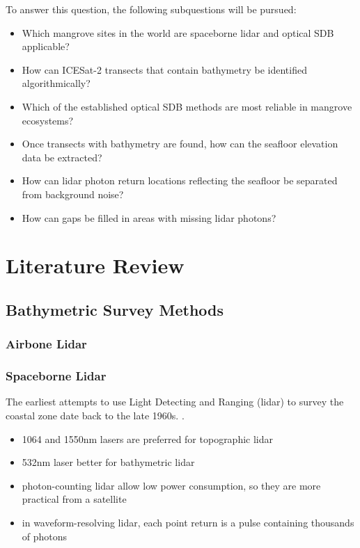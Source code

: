 To answer this question, the following subquestions will be pursued:

\begin{itemize}
      \item Which mangrove sites in the world are spaceborne lidar and optical SDB applicable?
      \item How can ICESat-2 transects that contain bathymetry be identified algorithmically?
      \item Which of the established optical SDB methods are most reliable in mangrove ecosystems?
      \item Once transects with bathymetry are found, how can the seafloor elevation data be extracted?
      \item How can lidar photon return locations reflecting the seafloor be separated from background noise?
      \item How can gaps be filled in areas with missing lidar photons?
\end{itemize}

\chapter{Literature Review}


\section{Bathymetric Survey Methods}

\subsection[]{Airbone Lidar}
\subsection{Spaceborne Lidar}

The earliest attempts to use Light Detecting and Ranging (lidar) to survey the coastal zone date back to the late 1960s. \parencite{Bailly2016}.

\begin{itemize}
      \item 1064 and 1550nm lasers are preferred for topographic lidar
      \item 532nm laser better for bathymetric lidar
      \item photon-counting lidar allow low power consumption, so they are more practical from a satellite
      \item in waveform-resolving lidar, each point return is a pulse containing thousands of photons
\end{itemize}

